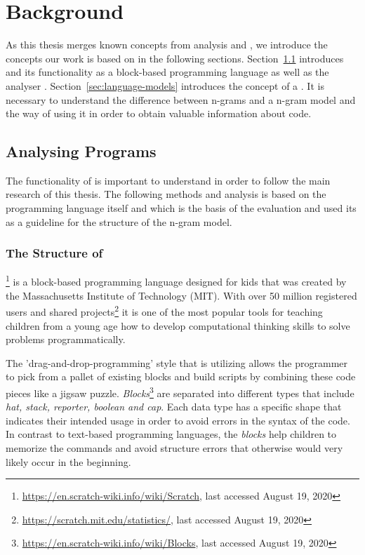 \chapter{Background}\label{chap:background}

As this thesis merges known concepts from \scratch{} analysis and \ngram{}, we introduce the concepts our work is based on in the following sections. Section~\ref{sec:analysing-scratch} introduces \scratch{} and its functionality as a block-based programming language as well as the \scratch{} analyser \litterbox{}. Section~\ref{sec:language-models} introduces the concept of a \ngram{}. It is necessary to understand the difference between n-grams and a n-gram model and the way of using it in order to obtain valuable information about \scratch{} code.


\section{Analysing \scratch{} Programs}\label{sec:analysing-scratch}
The functionality of \scratch{} is important to understand in order to follow the main research of this thesis. The following methods and analysis is based on the programming language \scratch{} itself and \litterbox{} which is the basis of the evaluation and used its \AST{} as a guideline for the structure of the n-gram model. 

\subsection{The Structure of \scratch{}}\label{subsec:scratch}
\scratch{}\footnote{\url{https://en.scratch-wiki.info/wiki/Scratch}, last accessed August 19, 2020} is a block-based programming language designed for kids that was created by the Massachusetts Institute of Technology (MIT). With over 50 million registered users and shared projects\footnote{\url{https://scratch.mit.edu/statistics/}, last accessed August 19, 2020} it is one of the most popular tools for teaching children from a young age how to develop computational thinking skills to solve problems programmatically.

The 'drag-and-drop-programming' style that \scratch{} is utilizing allows the programmer to pick from a pallet of existing blocks and build scripts by combining these code pieces like a jigsaw puzzle.
\textit{Blocks}\footnote{\url{https://en.scratch-wiki.info/wiki/Blocks}, last accessed August 19, 2020} are separated into different types that include \textit{hat, stack, reporter, boolean and cap}. Each data type has a specific shape that indicates their intended usage in order to avoid errors in the syntax of the code. In contrast to text-based programming languages, the \textit{blocks} help children to memorize the commands and avoid structure errors that otherwise would very likely occur in the beginning. 

